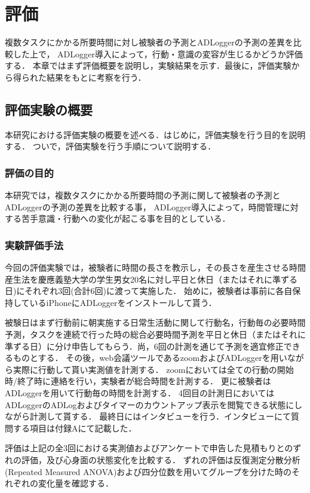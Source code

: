 \chapter{評価}
複数タスクにかかる所要時間に対し被験者の予測とADLoggerの予測の差異を比較した上で，
ADLogger導入によって，行動・意識の変容が生じるかどうか評価する．
本章ではまず評価概要を説明し，実験結果を示す．最後に，評価実験から得られた結果をもとに考察を行う．

\section{評価実験の概要}
本研究における評価実験の概要を述べる．はじめに，評価実験を行う目的を説明する．
ついで，評価実験を行う手順について説明する．

\subsection{評価の目的}
本研究では，複数タスクにかかる所要時間の予測に関して被験者の予測とADLoggerの予測の差異を比較する事，
ADLogger導入によって，時間管理に対する苦手意識・行動への変化が起こる事を目的としている．

\subsection{実験評価手法}
今回の評価実験では，被験者に時間の長さを教示し，その長さを産生させる時間産生法\cite{Oguro1961}\cite{Tayama2018}を慶應義塾大学の学生男女20名に対し平日と休日（またはそれに準ずる日)にそれぞれ3回(合計6回)に渡って実施した．
始めに，被験者は事前に各自保持しているiPhoneにADLoggerをインストールして貰う．

被験日はまず行動前に朝実施する日常生活動に関して行動名，行動毎の必要時間予測，タスクを連続で行った時の総合必要時間予測を平日と休日（またはそれに準ずる日）に分け申告してもらう．尚，6回の計測を通じて予測を適宜修正できるものとする．
その後，web会議ツールであるzoom\cite{zoom}およびADLoggerを用いながら実際に行動して貰い実測値を計測する．
zoomにおいては全ての行動の開始時/終了時に連絡を行い，実験者が総合時間を計測する．
更に被験者はADLoggerを用いて行動毎の時間を計測する．
4回目の計測日においてはADLoggerのADLogおよびタイマーのカウントアップ表示を閲覧できる状態にしながら計測して貰する．
最終日にはインタビューを行う．インタビューにて質問する項目は付録Aにて記載した．

評価は上記の全3回における実測値およびアンケートで申告した見積もりとのずれの評価，及び心身面の状態変化を比較する．
ずれの評価は反復測定分散分析(Repeated Measured ANOVA)および四分位数を用いてグループを分けた時のそれぞれの変化量を確認する．

